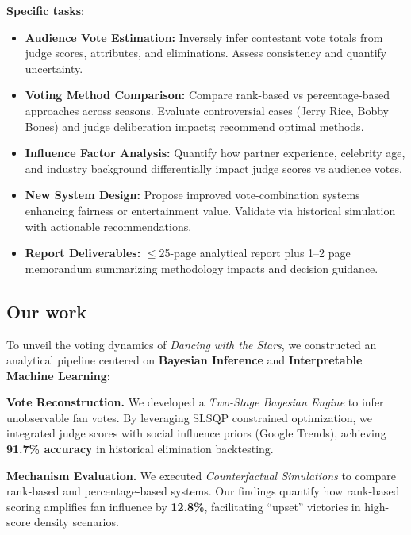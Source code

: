 \textbf{Specific tasks}:
\begin{itemize}
    \item \textbf{Audience Vote Estimation:} Inversely infer contestant vote totals from judge scores, attributes, and eliminations. Assess consistency and quantify uncertainty.
    
    \item \textbf{Voting Method Comparison:} Compare rank-based vs percentage-based approaches across seasons. Evaluate controversial cases (Jerry Rice, Bobby Bones) and judge deliberation impacts; recommend optimal methods.
    
    \item \textbf{Influence Factor Analysis:} Quantify how partner experience, celebrity age, and industry background differentially impact judge scores vs audience votes.
    
    \item \textbf{New System Design:} Propose improved vote-combination systems enhancing fairness or entertainment value. Validate via historical simulation with actionable recommendations.
    
    \item \textbf{Report Deliverables:} $\leq$25-page analytical report plus 1--2 page memorandum summarizing methodology impacts and decision guidance.
\end{itemize}


\subsection{Our work}

To unveil the voting dynamics of \textit{Dancing with the Stars}, we constructed an analytical pipeline centered on \textbf{Bayesian Inference} and \textbf{Interpretable Machine Learning}:

\textbf{Vote Reconstruction.} We developed a \textit{Two-Stage Bayesian Engine} to infer unobservable fan votes. By leveraging SLSQP constrained optimization, we integrated judge scores with social influence priors (Google Trends), achieving \textbf{91.7\% accuracy} in historical elimination backtesting.

\textbf{Mechanism Evaluation.} We executed \textit{Counterfactual Simulations} to compare rank-based and percentage-based systems. Our findings quantify how rank-based scoring amplifies fan influence by \textbf{12.8\%}, facilitating ``upset'' victories in high-score density scenarios.

